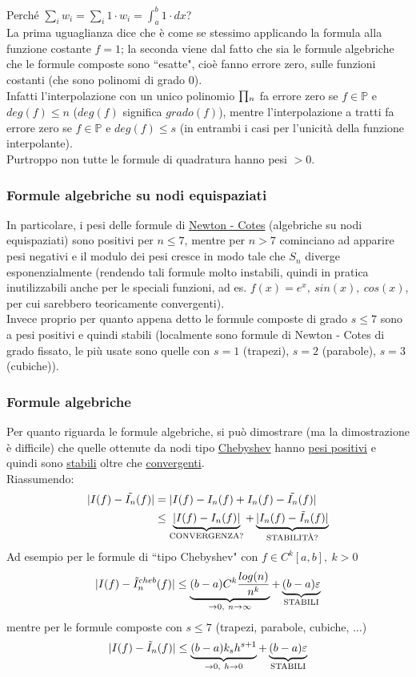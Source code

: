 Perché $\sum_i w_i = \sum_i 1 \cdot w_i = \int_a^b 1 \cdot dx$?\\
La prima uguaglianza dice che è come se stessimo applicando la formula alla funzione costante $f=1$; la seconda viene dal fatto
che sia le formule algebriche che le formule composte sono ``esatte", cioè fanno errore zero, sulle funzioni costanti (che sono polinomi di grado 0).\\
Infatti l'interpolazione con un unico polinomio $\begin{matrix}\prod\end{matrix}_n$ fa errore zero se $f \in \mathbb{P}$ e $deg(f) \le n$ ($deg(f)$ significa $grado(f)$), mentre l'interpolazione a tratti fa errore zero se $f \in \mathbb{P}$ e $deg(f) \le s$ (in entrambi i casi per l'unicità della funzione interpolante).\\
Purtroppo non tutte le formule di quadratura hanno pesi $>0$.

\subsubsection{Formule algebriche su nodi equispaziati}
In particolare, i pesi delle formule di \uline{Newton - Cotes} (algebriche su nodi equispaziati) sono positivi per $n \le 7$, mentre per $n>7$ cominciano ad apparire pesi negativi e il modulo dei pesi cresce in modo tale che $S_n$ diverge esponenzialmente (rendendo tali formule molto instabili, quindi in pratica inutilizzabili anche per le speciali funzioni, ad es. $f(x) = e^x, \ sin(x), \ cos(x)$, per cui sarebbero teoricamente convergenti).\\
Invece proprio per quanto appena detto le formule composte di grado $s \le 7$ sono a pesi positivi e quindi stabili (localmente sono formule di Newton - Cotes di grado fissato, le più usate sono quelle con $s=1$ (trapezi), $s=2$ (parabole), $s=3$ (cubiche)).

\subsubsection{Formule algebriche}
Per quanto riguarda le formule algebriche, si può dimostrare (ma la dimostrazione è difficile) che quelle ottenute da nodi tipo \uline{Chebyshev} hanno \uline{pesi positivi} e quindi sono \uline{stabili} oltre che \uline{convergenti}.\\
Riassumendo:
\[
\begin{split}
\lvert I(f) - \tilde{I_n}(f)\rvert & = \lvert I(f) - I_n(f) + I_n (f) - \tilde{I_n}(f)\rvert \\
& \le \underbrace{\lvert I(f) - I_n (f)\rvert}_{\text{CONVERGENZA?}} + \underbrace{\lvert I_n (f) - \tilde{I}_n (f)\rvert}_{\text{STABILITÀ?}}
\end{split}
\]
Ad esempio per le formule di ``tipo Chebyshev" con $f \in C^k [a,b], \ k > 0$
\[
\lvert I(f) - \tilde{I}_n^{cheb}(f)\rvert \le \underbrace{(b-a) C^k \frac{log(n)}{n^k}}_{\to 0, \ n \to \infty} + \underbrace{(b-a)\varepsilon}_{\text{STABILI}}
\]
mentre per le formule composte con $s \le 7$ (trapezi, parabole, cubiche, $\dotso$)
\[
\lvert I(f) - \tilde{I}_n(f)\rvert \le \underbrace{(b-a)k_s h^{s+1}}_{\to 0, \ h \to 0} + \underbrace{(b-a)\varepsilon}_{\text{STABILI}}
\]

